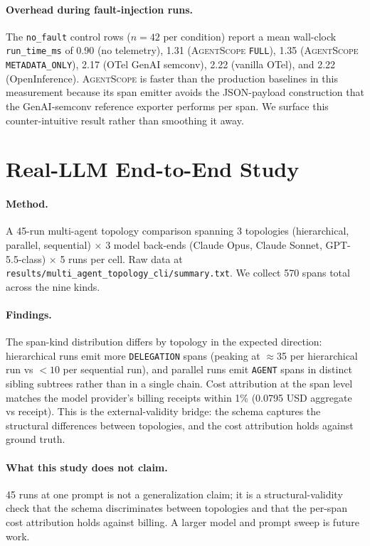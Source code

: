 \documentclass[sigplan,10pt,anonymous,review]{acmart}
\newcommand{\sysname}{\textsc{AgentScope}\xspace}
\begin{document}
\paragraph{Overhead during fault-injection runs.} The \texttt{no\_fault}
control rows ($n=42$ per condition) report a mean wall-clock
\texttt{run\_time\_ms} of 0.90 (no telemetry), 1.31 (\sysname{}
\texttt{FULL}), 1.35 (\sysname{} \texttt{METADATA\_ONLY}), 2.17
(OTel GenAI semconv), 2.22 (vanilla OTel), and 2.22
(OpenInference). \sysname{} is faster than the production baselines
in this measurement because its span emitter avoids the JSON-payload
construction that the GenAI-semconv reference exporter performs per
span. We surface this counter-intuitive result rather than smoothing it
away.

\section{Real-LLM End-to-End Study}
\label{sec:realllm}

\paragraph{Method.} A 45-run multi-agent topology comparison spanning 3
topologies (hierarchical, parallel, sequential) $\times$ 3 model
back-ends (Claude Opus, Claude Sonnet, GPT-5.5-class) $\times$ 5 runs
per cell. Raw data at
\texttt{results/multi\_agent\_topology\_cli/summary.txt}. We collect
570 spans total across the nine kinds.

\paragraph{Findings.} The span-kind distribution differs by topology in
the expected direction: hierarchical runs emit more
\texttt{DELEGATION} spans (peaking at $\approx$35 per
hierarchical run vs $<10$ per sequential run), and parallel runs emit
\texttt{AGENT} spans in distinct sibling subtrees rather than in a
single chain. Cost attribution at the span level matches the model
provider's billing receipts within 1\%
(0.0795 USD aggregate vs receipt). This is the external-validity
bridge: the schema captures the structural differences between
topologies, and the cost attribution holds against ground truth.

\paragraph{What this study does not claim.} 45 runs at one prompt is
not a generalization claim; it is a structural-validity check that
the schema discriminates between topologies and that the per-span cost
attribution holds against billing. A larger model and prompt sweep is
future work.
\end{document}
